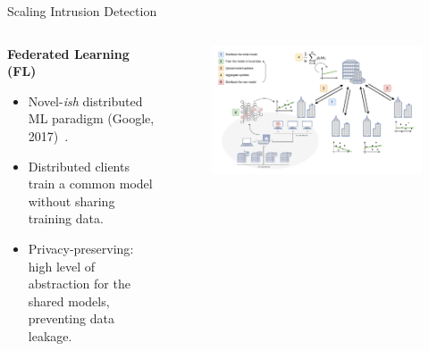 \begin{frame}{Scaling Intrusion Detection}

  \begin{columns}
    \begin{column}{0.4\textwidth}
      \textbf{Federated Learning (FL)}
      \small
      \begin{itemize}[<+->]
        \item Novel-\emph{ish} distributed ML paradigm (Google, 2017)~\autocite{mcmahan_Communicationefficientlearningdeep_2017}.
        \item Distributed clients  train a common model without sharing training data.
        \item \alert{Privacy-preserving}: high level of abstraction for the shared models, preventing data leakage.
      \end{itemize}
    \end{column}
    
    \begin{column}{0.6\textwidth}
      \begin{figure}
        \centering
        \includegraphics[width=\linewidth]{figures/intro/fl.drawio.pdf}
      \end{figure}
    \end{column}
  \end{columns}

\end{frame}


